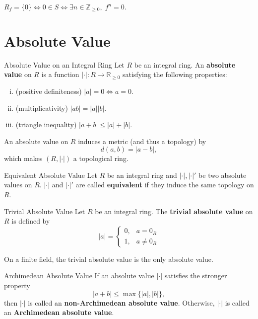 \begin{prf}
    $R_f=\{0\}\iff 0\in S\iff \exists n\in\mathbb{Z}_{\ge0},\;f^n=0$.
\end{prf}

\section{Absolute Value}
\begin{definition}{Absolute Value on an Integral Ring}{}
    Let $R$ be an integral ring. An \textbf{absolute value} on $R$ is a function $|\cdot|:R\to \mathbb{R}_{\ge0}$ satisfying the following properties:
    \begin{enumerate}[(i)]
        \item (positive definiteness) $|a|=0\iff a=0$.
        \item (multiplicativity) $|ab|=|a||b|$.
        \item (triangle inequality) $|a+b|\le |a|+|b|$.
    \end{enumerate}
\end{definition}

An absolute value on $R$ induces a metric (and thus a topology) by 
\[
    d(a,b)=|a-b|,
\]
which makes $(R,|\cdot|)$ a topological ring. 
\begin{definition}{Equivalent Absolute Value}{}
    Let $R$ be an integral ring and $|\cdot|,|\cdot|'$ be two absolute values on $R$. $|\cdot|$ and $|\cdot|'$ are called \textbf{equivalent} if they induce the same topology on $R$.
\end{definition}

\begin{definition}{Trivial Absolute Value}{}
    Let $R$ be an integral ring. The \textbf{trivial absolute value} on $R$ is defined by 
    \[
        |a|=\begin{cases}
            0, & a=0_R\\
            1, & a\ne 0_R
        \end{cases}
    \]
\end{definition}

On a finite field, the trivial absolute value is the only absolute value.
\begin{definition}{Archimedean Absolute Value}{}
    If an absolute value $|\cdot|$ satisfies the stronger property 
    \[
        |a+b|\le \max\{|a|,|b|\},
    \]
    then $|\cdot|$ is called an \textbf{non-Archimedean absolute value}. Otherwise, $|\cdot|$ is called an \textbf{Archimedean absolute value}.
\end{definition}

